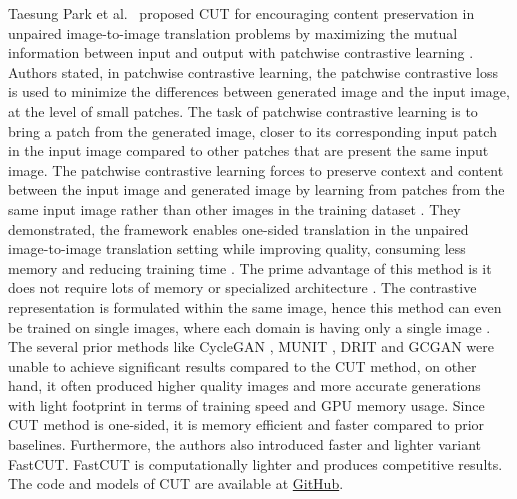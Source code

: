 Taesung Park et al.\ \cite{park2020contrastive} proposed \ac{CUT} for encouraging content preservation in unpaired image-to-image translation problems by maximizing the mutual information between input and output with patchwise contrastive learning \cite{oord2019representation}. Authors stated, in patchwise contrastive learning, the patchwise contrastive loss is used to minimize the differences between generated image and the input image, at the level of small patches. The task of patchwise contrastive learning is to bring a patch from the generated image, closer to its corresponding input patch in the input image compared to other patches that are present the same input image. The patchwise contrastive learning forces to preserve context and content between the input image and generated image by learning from patches from the same input image rather than other images in the training dataset \cite{park2020contrastive}. They demonstrated, the framework enables one-sided translation in the unpaired image-to-image translation setting while improving quality, consuming less memory and reducing training time \cite{park2020contrastive}. The prime advantage of this method is it does not require lots of memory \cite{8578491} \cite{he2020momentum} or specialized architecture \cite{henaff2020dataefficient} \cite{bachman2019learning}. The contrastive representation is formulated within the same image, hence this method can even be trained on single images, where each domain is having only a single image \cite{park2020contrastive}. The several prior methods like \ac{CycleGAN} \cite{zhu2020unpaired}, \ac{MUNIT} \cite{liu2018unsupervised}, \ac{DRIT} \cite{lee2019drit} and \ac{GCGAN} \cite{fu2018geometryconsistent} were unable to achieve significant results compared to the \ac{CUT} method, on other hand, it often produced higher quality images and more accurate generations with light footprint in terms of training speed and GPU memory usage. Since \ac{CUT} method is one-sided, it is memory efficient and faster compared to prior baselines. Furthermore, the authors also introduced faster and lighter variant \ac{FastCUT}. \ac{FastCUT} is computationally lighter and produces competitive results. The code and models of \ac{CUT} are available at \href{https://github.com/taesungp/contrastive-unpaired-translation}{GitHub}.


